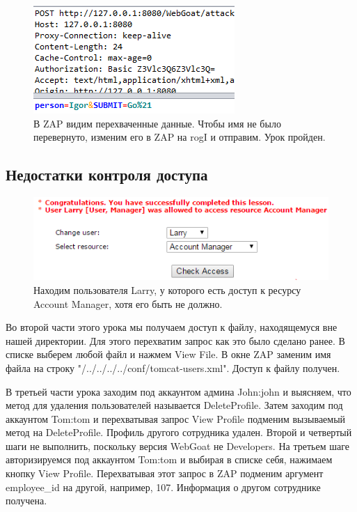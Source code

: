\documentclass[a4paper, 14pt]{article}				%
\begin{document}
\begin{figure}[h!]
\centering
\includegraphics[width=\textwidth]{rsrc/1_2}
\caption{В ZAP видим перехваченные данные. Чтобы имя не было перевернуто, изменим его в ZAP на rogI и отправим. Урок пройден.}
\end{figure}

\newpage
\subsection{Недостатки контроля доступа}
\begin{figure}[h!]
\centering
\includegraphics[width=\textwidth]{rsrc/2_1}
\caption{Находим пользователя Larry, у которого есть доступ к ресурсу Account Manager, хотя его быть не должно.}
\end{figure}

Во второй части этого урока мы получаем доступ к файлу, находящемуся вне нашей директории. Для этого перехватим запрос как это было сделано ранее. В списке выберем любой файл и нажмем View File. В окне ZAP заменим имя файла на строку "/../../../../conf/tomcat-users.xml". Доступ к файлу получен.

В третьей части урока заходим под аккаунтом админа John:john и выясняем, что метод для удаления пользователей называется DeleteProfile. Затем заходим под аккаунтом Tom:tom и перехватывая запрос View Profile подменим вызываемый метод на DeleteProfile. Профиль другого сотрудника удален. 
Второй и четвертый шаги не выполнить, поскольку версия WebGoat не Developers. На третьем шаге авторизируемся под аккаунтом Tom:tom и выбирая в списке себя, нажимаем кнопку View Profile. Перехватывая этот запрос в ZAP подменим аргумент employee\_id на другой, например, 107. Информация о другом сотруднике получена.
\end{document}
